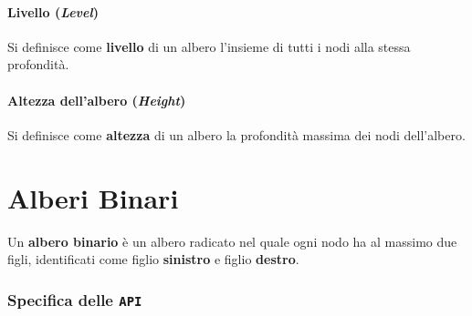     \paragraph{Livello (\textit{Level})}
        \begin{definition}
            Si definisce come \textbf{livello} di un albero l'insieme di tutti i nodi alla stessa profondità.
        \end{definition}
    \paragraph{Altezza dell'albero (\textit{Height})}
        \begin{definition}
            Si definisce come \textbf{altezza} di un albero la profondità massima dei nodi dell'albero.
        \end{definition}
\section{Alberi Binari}
    \begin{definition}
        Un \textbf{albero binario} è un albero radicato nel quale ogni nodo ha al massimo due figli, identificati come figlio \textbf{sinistro} e figlio \textbf{destro}.
    \end{definition}
    \subsubsection{Specifica delle \texttt{API}}

